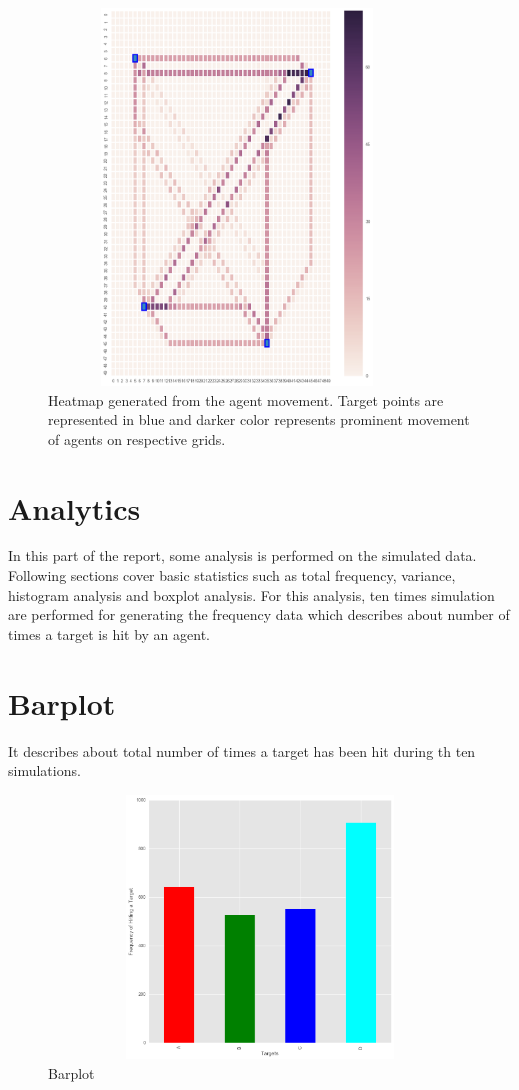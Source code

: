 \documentclass[11pt]{report}
\begin{document}
\begin{figure}[h!]
  \centering
  \includegraphics[height = 10cm, width = 10cm]{heatmap_2.png}
  \caption{Heatmap generated from the agent movement. Target points are represented in blue and darker color represents prominent movement of agents on respective grids.}
  \label{fig:heatmap_2}
\end{figure}


\newpage
\section{\color{cyan} Analytics}
In this part of the report, some analysis is performed on the simulated data. Following sections cover basic statistics such as total frequency, variance, histogram analysis and boxplot analysis.
For this analysis, ten times simulation are performed for generating the frequency data which describes about number of times a target is hit by an agent.

\section{Barplot}
It describes about total number of times a target has been hit during th ten simulations.

\begin{figure}[h!]
  \centering
  \includegraphics[height = 7cm, width = 14cm]{barplot.png}
  \caption{Barplot}
  \label{fig:barplot}
\end{figure}
\end{document}

